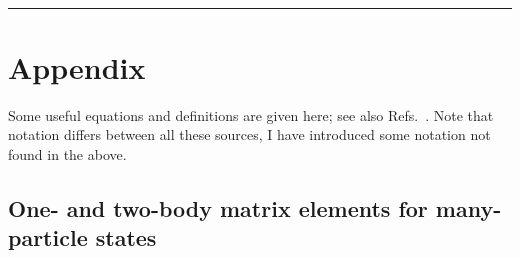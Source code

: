 \documentclass[10pt,twocolumn,a4paper]{article}%
\begin{document}
\newpage
~\\\hrule
\appendix

\setcounter{equation}{0}
\setcounter{figure}{0}
\setcounter{table}{0}
\renewcommand{\theequation}{A.\arabic{equation}}
\renewcommand{\thefigure}{A.\arabic{figure}}
\renewcommand{\thetable}{A.\arabic{table}}

\section{Appendix}
\small

Some useful equations and definitions are given here; see also Refs.~\cite{LLVol3,JohnsonBook2007,Sobelman1992,Varshalovich1988,Lindgren1986,Sapirstein1998,DzubaHFS1984}.
Note that notation differs between all these sources, I have introduced some notation not found in the above.


\subsection{One- and two-body matrix elements for many-particle states}
\end{document}

